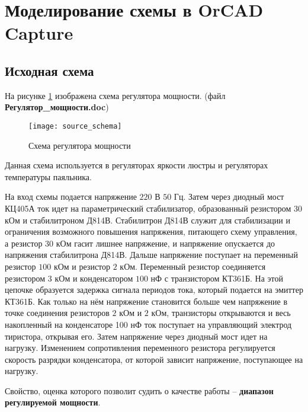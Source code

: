 





\newpage

\section{Моделирование схемы в OrCAD Capture}

\subsection{Исходная схема}

На рисунке \ref{pic:scheme} изображена схема регулятора мощности. (файл \textbf{Регулятор\_мощности.doc})

\begin{figure}[H]
\begin{center}
	\texttt{[image: source\_schema]}
	\caption{Схема регулятора мощности}
	\label{pic:scheme}
\end{center}
\end{figure}

Данная схема используется в регуляторах яркости люстры и регуляторах температуры паяльника.

На вход схемы подается напряжение $220$ В $50$ Гц. Затем через диодный мост КЦ405А ток идет на параметрический стабилизатор, образованный резистором $30$ кОм и стабилитроном Д814В. Стабилитрон Д814В служит для стабилизации и ограничения возможного повышения напряжения, питающего схему управления, а резистор $30$ кОм гасит лишнее напряжение, и напряжение опускается до напряжения стабилитрона Д814В. Дальше напряжение поступает на переменный резистор $100$ кОм и резистор $2$ кОм. Переменный резистор соединяется резистором $3$ кОм и конденсатором $100$ нФ с транзистором КТ361Б. На этой цепочке образуется задержка сигнала периодов тока, который подается на эмиттер КТ361Б. Как только на нём напряжение становится больше чем напряжение в точке соединения резисторов $2$ кОм и $2$ кОм, транзисторы открываются и весь накопленный на конденсаторе 100 нФ ток поступает на управляющий электрод тиристора, открывая его. Затем напряжение через диодный мост идет на нагрузку. Изменением сопротивления переменного резистора регулируется скорость разрядки конденсатора, от которой зависит напряжение, поступающее на нагрузку.

Свойство, оценка которого позволит судить о качестве работы -- \textbf{диапазон регулируемой мощности}.

